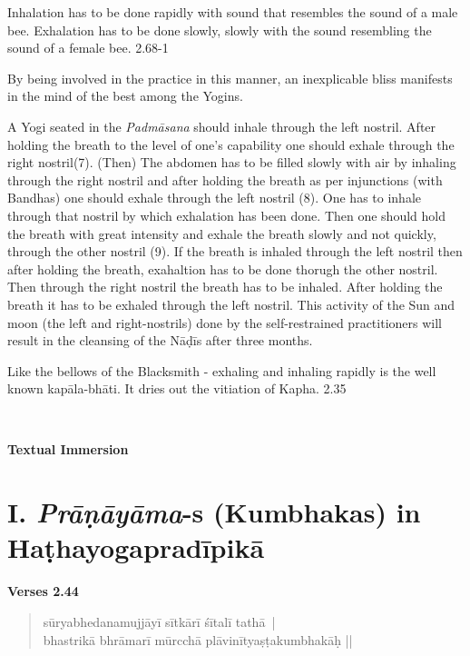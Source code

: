 
Inhalation has to be done rapidly with sound that resembles the sound of a male bee. Exhalation has to be done slowly, slowly with the sound resembling the sound of a female bee. 2.68-1


By being involved in the practice in this manner, an inexplicable bliss manifests in the mind of the best among the Yogins.


A Yogi seated in the \textit{Padmāsana} should inhale through the left nostril. After holding the breath to the level of one’s capability one should exhale through the right nostril(7). (Then) The abdomen has to be filled slowly with air by inhaling through the right nostril and after holding the breath as per injunctions (with Bandhas) one should exhale through the left nostril (8). One has to inhale through that nostril by which exhalation has been done. Then one should hold the breath with great intensity and exhale the breath slowly and not quickly, through the other nostril (9).  If the breath is inhaled through the left nostril then after holding the breath, exahaltion has to be done thorugh the other nostril. Then through the right nostril the breath has to be inhaled. After holding the breath it has to be exhaled through the left nostril. This activity of the Sun and moon (the left and right-nostrils) done by the self-restrained practitioners will result in the cleansing of the Nāḍīs after three months. 


Like the bellows of the Blacksmith - exhaling and inhaling rapidly is the well known kapāla-bhāti. It dries out the vitiation of Kapha. 2.35
\newpage

\thispagestyle{empty}
~
\vfill
\begin{center}
\textbf{\Huge Textual Immersion}
\end{center}
\vfill
\eject

\section*{I. \textit{Prāṇāyāma}-s (Kumbhakas) in Haṭhayogapradī\-pikā}

\noindent 
\textbf{Verses 2.44}

\begin{verse}
sūryabhedanamujjāyī sītkārī śītalī tathā |\\
bhastrikā bhrāmarī mūrcchā plāvinītyaṣṭakumbhakāḥ ||
\end{verse}


